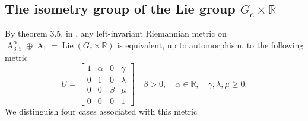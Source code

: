 \documentclass[12pt,a4paper,twoside]{article}
\theoremstyle{definition}
\begin{document}
\subsection{The isometry group of the Lie group $G_{c} \times \mathbb{R}$}
By theorem 3.5. in \cite{aitbenhaddou2025classification}, any left-invariant Riemannian metric on $\operatorname{A}_{3, 5}^{\alpha} \oplus \operatorname{A}_1 = \operatorname{Lie}(G_{c} \times \mathbb{R})$ is equivalent, up to automorphism, to the following metric
$$U = \begin{bmatrix}
1 & \alpha & 0 & \gamma\\
0 & 1 & 0 & \lambda\\
0 & 0 & \beta & \mu\\
0 & 0 & 0 & 1
\end{bmatrix} \quad \beta > 0, \quad \alpha \in \mathbb{R}, \quad \gamma, \lambda, \mu \geq 0.$$
We distinguish four cases associated with this metric
\end{document}
